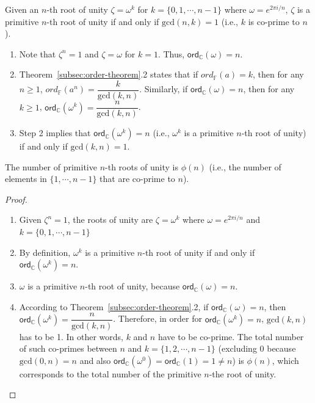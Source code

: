 \begin{tcolorbox}[title={\textbf{\tboxtheorem{\ref*{subsec:roots-theorem}.4} Condition for Primitive $\bm{n}$-th Roots of Unity}}]
Given an $n$-th root of unity $\zeta = \omega^k$ for $k = \{0, 1, \cdots, n-1\}$ where $\omega = e^{2\pi i/n}$, $\zeta$ is a primitive $n$-th root of unity if and only if $\text{gcd}(n, k) = 1$ (i.e., $k$ is co-prime to $n$).
\end{tcolorbox}
\begin{myproof}
    \begin{enumerate}
    \item Note that $\zeta^n = 1$ and $\zeta = \omega$ for $k = 1$. Thus, $\textsf{ord}_{\mathbb{C}}(\omega) = n$.
    \item Theorem~\ref*{subsec:order-theorem}.2 states that if $ord_{\mathbb{F}}(a) = k$, then for any $n \geq 1$, $ord_{\mathbb{F}}(a^n) = \dfrac{k}{\text{gcd}(k,n)}$. Similarly, if $\textsf{ord}_{\mathbb{C}}(\omega) = n$, then for any $k \geq 1$, $\textsf{ord}_{\mathbb{C}}(\omega^k) = \dfrac{n}{\text{gcd}(k, n)}$.
    \item Step 2 implies that $\textsf{ord}_{\mathbb{C}}(\omega^k) = n$ (i.e., $\omega^k$ is a primitive $n$-th root of unity) if and only if $\text{gcd}(k, n) = 1$.
    \end{enumerate}
\end{myproof}

\begin{tcolorbox}[title={\textbf{\tboxtheorem{\ref*{subsec:roots-theorem}.5} The number of Primitive $\bm{n}$-th Roots of Unity}}]
The number of primitive $n$-th roots of unity is $\phi(n)$ (i.e., the number of elements in $\{1, \cdots, n-1 \}$ that are co-prime to $n$).
\end{tcolorbox}

\begin{proof}
$ $
\begin{enumerate}
\item Given $\zeta^n = 1$, the roots of unity are $\zeta = \omega^k$ where $\omega = e^{2\pi i/n}$ and $k = \{0, 1, \cdots, n-1\}$ 
\item By definition, $\omega^k$ is a primitive $n$-th root of unity if and only if $\textsf{ord}_{\mathbb{C}}(\omega^k) = n$. 
\item $\omega$ is a primitive $n$-th root of unity, because $\textsf{ord}_{\mathbb{C}}(\omega) = n$. 
\item According to Theorem~\ref*{subsec:order-theorem}.2, if $\textsf{ord}_{\mathbb{C}}(\omega) = n$, then $\textsf{ord}_{\mathbb{C}}(\omega^k) = \dfrac{n}{\text{gcd}(k,n)}$. Therefore, in order for $\textsf{ord}_{\mathbb{C}}(\omega^k) = n$, $\text{gcd}(k,n)$ has to be 1. In other words, $k$ and $n$ have to be co-prime.
The total number of such co-primes between $n$ and $k = \{1, 2, \cdots, n-1\}$ (excluding 0 because $\text{gcd}(0, n)= n$ and also $\textsf{ord}_{\mathbb{C}}(\omega^0) = \textsf{ord}_{\mathbb{C}}(1) = 1 \neq n$) is $\phi(n)$, which corresponds to the total number of the primitive $n$-the root of unity.
\end{enumerate}
\end{proof}